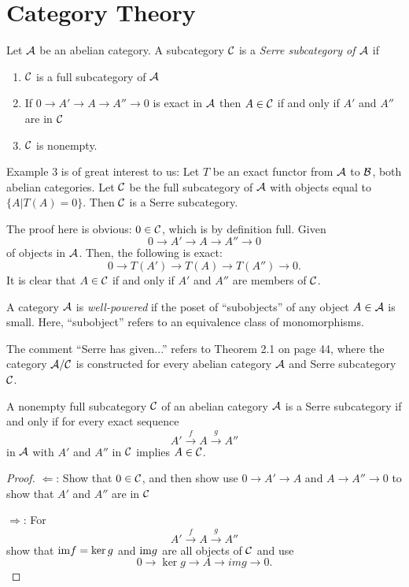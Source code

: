 \section{Category Theory}

\begin{definition} 
Let $\mathcal{A}$ be an abelian category. A subcategory
$\mathcal{C}$ is a \emph{Serre subcategory of $\mathcal{A}$}
if
\begin{enumerate}
\item $\mathcal{C}$ is a full subcategory of $\mathcal{A}$

\item If $0 \to A' \to A \to A''\to 0$ is exact in $\mathcal{A}$
then $A \in \mathcal{C}$ if and only if $A'$ and $A''$ are in
$\mathcal{C}$

\item $\mathcal{C}$ is nonempty.
\end{enumerate}
\end{definition}

Example 3 is of great interest to us: Let $T$ be an exact
functor from $\mathcal{A}$ to $\mathcal{B}$, both abelian categories.
Let $\mathcal{C}$ be the full subcategory of $\mathcal{A}$ with objects
equal to $\{A | T(A) = 0\}$. Then $\mathcal{C}$ is a Serre 
subcategory.

The proof here is obvious: $0 \in \mathcal{C}$, which is by 
definition full. Given
\[
0 \to A' \to A \to A'' \to 0
\]
of objects in $\mathcal{A}$. Then, the following is exact:
\[
0 \to T(A') \to T(A) \to T(A'') \to 0.
\]
It is clear that $A \in \mathcal{C}$ if and only if $A'$ and
$A''$ are members of $\mathcal{C}$.

\begin{definition}
A category $\mathcal{A}$ is \emph{well-powered} if the poset
of ``subobjects'' of any object $A \in \mathcal{A}$ is small.
Here, ``subobject'' refers to an equivalence class of
monomorphisms.
\end{definition}

The comment ``Serre has given...'' refers to Theorem 2.1 on
page 44, where the category $\mathcal{A}/\mathcal{C}$ is constructed
for every abelian category $\mathcal{A}$ and Serre subcategory
$\mathcal{C}$.

\begin{prop}
A nonempty full subcategory $\mathcal{C}$ of an abelian category
$\mathcal{A}$ is a Serre subcategory if and only if for every
exact sequence
\[
A' \stackrel{f}{\to} A \stackrel{g}{\to} A''
\]
in $\mathcal{A}$ with $A'$ and $A''$ in $\mathcal{C}$ implies
$A \in \mathcal{C}$.
\end{prop}
\begin{proof}
\noindent$\Leftarrow$: Show that $0 \in \mathcal{C}$, and then show
use $0 \to A' \to A$ and $A \to A'' \to 0$ to show that $A'$
and $A''$ are in $\mathcal{C}$

\noindent$\Rightarrow$: For
\[
A' \stackrel{f}{\to} A \stackrel{g}{\to} A''
\]
show that $\mathrm{im} f = \ker g$ and $\mathrm{im} g$ are all
objects of $\mathcal{C}$ and use
\[
0 \to \ker g \to A \to im g \to 0.
\]
\end{proof}

